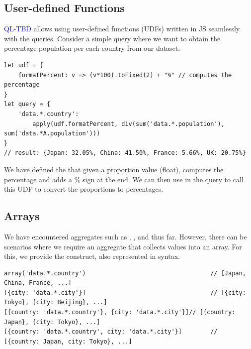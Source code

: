 \documentclass[runningheads]{llncs}
\newcommand{\lang}{\textcolor{blue}{QL-TBD}}
\begin{document}



\subsection{User-defined Functions}
\lang{} allows using user-defined functions (UDFs) written in JS seamlessly with the
queries.
Consider a simple query where we want to obtain the percentage population per each
country from our dataset.

\begin{lstlisting}[style=JavaScript, columns=flexible]
let udf = {
    formatPercent: v => (v*100).toFixed(2) + "%" // computes the percentage 
}
let query = {
    'data.*.country':
        apply(udf.formatPercent, div(sum('data.*.population'), sum('data.*A.population')))
}
// result: {Japan: 32.05%, China: 41.50%, France: 5.66%, UK: 20.75%}
\end{lstlisting}

We have defined the  that given a proportion value (float),
computes the percentage and adds a \% sign at the end.
We can then use  in the query to call this UDF to convert the
proportions to percentages.


\subsection{Arrays}
We have encountered aggregates such as , , and 
thus far.
However, there can be scenarios where we require an aggregate that collects values
into an array.
For this, we provide the  construct, also represented in \inline{[]} syntax.

\begin{lstlisting}[style=JavaScript, columns=flexible]
array('data.*.country')                                   // [Japan, China, France, ...]
[{city: 'data.*.city'}]                                   // [{city: Tokyo}, {city: Beijing}, ...]
[{country: 'data.*.country'}, {city: 'data.*.city'}]// [{country: Japan}, {city: Tokyo}, ...]
[{country: 'data.*.country', city: 'data.*.city'}]        // [{country: Japan, city: Tokyo}, ...]
\end{lstlisting}
\end{document}
